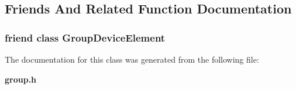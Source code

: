 \subsection{Friends And Related Function Documentation}
\subsubsection[{Group\-Device\-Element}]{\setlength{\rightskip}{0pt plus 5cm}friend class {\bf Group\-Device\-Element}\hspace{0.3cm}{\ttfamily [friend]}}\label{classTango_1_1AsynchRequest_ac6facd8fbba95d830b9806ceffb3a5bd}


The documentation for this class was generated from the following file\-:\begin{DoxyCompactItemize}
\item 
{\bf group.\-h}\end{DoxyCompactItemize}
